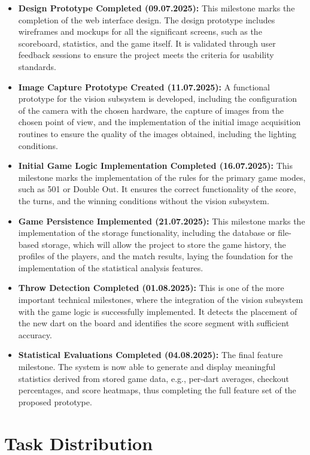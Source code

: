 \begin{itemize}
    \item \textbf{Design Prototype Completed (09.07.2025):} This milestone marks the completion of the web interface design. The design prototype includes wireframes and mockups for all the significant screens, such as the scoreboard, statistics, and the game itself. It is validated through user feedback sessions to ensure the project meets the criteria for usability standards.
    \item \textbf{Image Capture Prototype Created (11.07.2025):} A functional prototype for the vision subsystem is developed, including the configuration of the camera with the chosen hardware, the capture of images from the chosen point of view, and the implementation of the initial image acquisition routines to ensure the quality of the images obtained, including the lighting conditions.
    \item \textbf{Initial Game Logic Implementation Completed (16.07.2025):} This milestone marks the implementation of the rules for the primary game modes, such as 501 or Double Out. It ensures the correct functionality of the score, the turns, and the winning conditions without the vision subsystem.
    \item \textbf{Game Persistence Implemented (21.07.2025):} This milestone marks the implementation of the storage functionality, including the database or file-based storage, which will allow the project to store the game history, the profiles of the players, and the match results, laying the foundation for the implementation of the statistical analysis features.
    \item \textbf{Throw Detection Completed (01.08.2025):} This is one of the more important technical milestones, where the integration of the vision subsystem with the game logic is successfully implemented. It detects the placement of the new dart on the board and identifies the score segment with sufficient accuracy.
    \item \textbf{Statistical Evaluations Completed (04.08.2025):} The final feature milestone. The system is now able to generate and display meaningful statistics derived from stored game data, e.g., per-dart averages, checkout percentages, and score heatmaps, thus completing the full feature set of the proposed prototype.
\end{itemize}

\section{Task Distribution}

